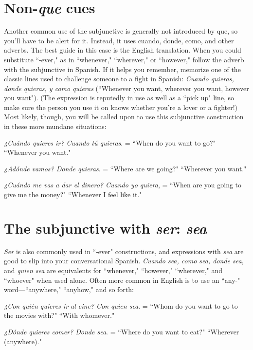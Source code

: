 \section{Non-\emph{que} cues}

Another common use of the subjunctive is generally not introduced by que, so you'll have to be alert for it. Instead, it uses cuando,
donde, como, and other adverbs. The best guide in this case is the English translation. When you could substitute ``-ever," as in ``whenever," ``wherever," or ``however," follow the adverb with the subjunctive
in Spanish. If it helps you remember, memorize one of the classic
lines used to challenge someone to a fight in Spanish: \emph{Cuando quieras,
donde quieras, y como quieras} (``Whenever you want, wherever you
want, however you want"). (The expression is reputedly in use as well
as a ``pick up" line, so make sure the person you use it on knows
whether you're a lover or a fighter!) Most likely, though, you will be
called upon to use this subjunctive construction in these more mundane situations:

\bsk

\indu \emph{¿Cuándo quieres ir? Cuando tú quieras}. = ``When do you
want to go?" ``Whenever you want."

\indu \emph{¿Adónde vamos? Donde quieras}. = ``Where are we going?"
``Wherever you want."

\indu \emph{¿Cuándo me vas a dar el dinero? Cuando yo quiera}, = ``When
are you going to give me the money?" ``Whenever I
feel like it."

\section{The subjunctive with \emph{ser}: \emph{sea}}

\emph{Ser} is also commonly used in ``-ever" constructions, and expressions with \emph{sea} are good to slip into your conversational Spanish.
\emph{Cuando sea, como sea, donde sea}, and \emph{quien sea} are equivalents for
``whenever," ``however," ``wherever," and ``whoever" when used alone.
Often more common in English is to use an ``any-" word---``anywhere," ``anyhow," and so forth:

\bsk

\indu \emph{¿Con quién quieres ir al cine? Con quien sea}. = ``Whom
do you want to go to the movies with?" ``With
whomever."

\indu \emph{¿Dónde quieres comer? Donde sea}. = ``Where do you want to
eat?" ``Wherever (anywhere)."


